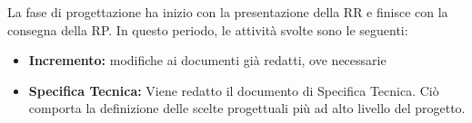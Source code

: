 La fase di progettazione ha inizio con la presentazione della RR e finisce con la consegna della RP.\newline
In questo periodo, le attività svolte sono le seguenti:
\begin{itemize}
	\item \textbf{Incremento: } modifiche ai documenti già redatti, ove necessarie
	\item \textbf{Specifica Tecnica: }Viene redatto il documento di Specifica Tecnica. Ciò comporta la definizione delle scelte progettuali più ad alto livello del progetto.
\end{itemize}